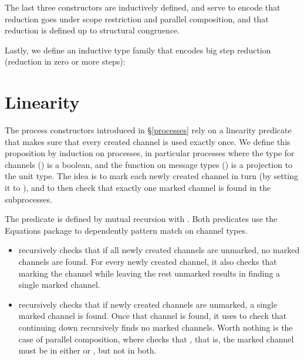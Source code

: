 \documentclass{mproj}
\begin{document}
The last three constructors are inductively defined, and serve to encode that reduction goes under scope restriction and parallel composition, and that reduction is defined up to structural congruence.


Lastly, we define an inductive type family that encodes big step reduction (reduction in zero or more steps):



\section{Linearity}\label{linearity}

The process constructors introduced in \S \ref{processes} rely on a linearity predicate that makes sure that every created channel is used exactly once. We define this proposition by induction on processes, in particular processes where the type for channels () is a boolean, and the function on message types () is a projection to the unit type. The idea is to mark each newly created channel in turn (by setting it to ), and to then check that exactly one marked channel is found in the subprocesses.


The predicate  is defined by mutual recursion with . Both predicates use the Equations package to dependently pattern match on channel types.
\begin{itemize}
    \item {} recursively checks that if all newly created channels are unmarked, no marked channels are found. For every newly created channel, it also checks that marking the channel while leaving the rest unmarked results in  finding a single marked channel.  

    \item {} recursively checks that if newly created channels are unmarked, a single marked channel is found. Once that channel is found, it uses  to check that continuing down recursively finds no marked channels. Worth nothing is the case of parallel composition, where  checks that , that is, the marked channel must be in either  or , but not in both.
\end{itemize}
\end{document}
